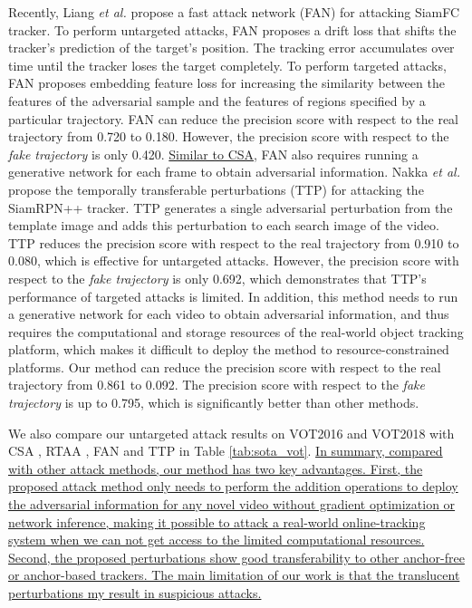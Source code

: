 \documentclass[journal]{IEEEtran}
\begin{document}
Recently, Liang \textit{et al.} \cite{FAN} propose a fast attack network (FAN) for attacking SiamFC tracker. To perform untargeted attacks, FAN proposes a drift loss that shifts the tracker's prediction of the target's position. The tracking error accumulates over time until the tracker loses the target completely. To perform targeted attacks, FAN proposes embedding feature loss for increasing the similarity between the features of the adversarial sample and the features of regions specified by a particular trajectory. FAN can reduce the precision score with respect to the real trajectory from 0.720 to 0.180. However, the precision score with respect to the \textit{fake trajectory} is only 0.420. \uline{Similar to CSA}, FAN also requires running a generative network for each frame to obtain adversarial information. Nakka \textit{et al.} \cite{TTP} propose the temporally transferable perturbations (TTP) for attacking the SiamRPN++ tracker. TTP generates a single adversarial perturbation from the template image and adds this perturbation to each search image of the video. TTP reduces the precision score with respect to the real trajectory from 0.910 to 0.080, which is effective for untargeted attacks. However, the precision score with respect to the \textit{fake trajectory} is only 0.692, which demonstrates that TTP's performance of targeted attacks is limited. In addition, this method needs to run a generative network for each video to obtain adversarial information, and thus requires the computational and storage resources of the real-world object tracking platform, which makes it difficult to deploy the method to resource-constrained platforms. Our method can reduce the precision score with respect to the real trajectory from 0.861 to 0.092. The precision score with respect to the \textit{fake trajectory} is up to 0.795, which is significantly better than other methods.

We also compare our untargeted attack results on VOT2016 and VOT2018 with CSA \cite{CSA}, RTAA \cite{RTAA}, FAN \cite{FAN} and TTP \cite{TTP} in Table \ref{tab:sota_vot}. 
\uline{In summary, compared with other attack methods, our method has two key advantages. First, the proposed attack method only needs to perform the addition operations to deploy the adversarial information for any novel video without gradient optimization or network inference, making it possible to attack a real-world online-tracking system when we can not get access to the limited computational resources. Second, the proposed perturbations show good transferability to other anchor-free or anchor-based trackers. The main limitation of our work is that the translucent perturbations my result in suspicious attacks.}
\end{document}
